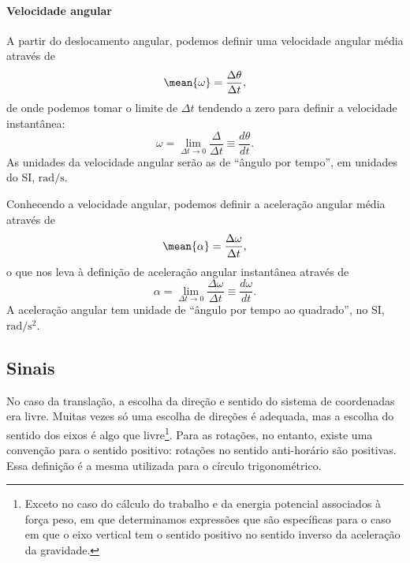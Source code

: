 \paragraph{Velocidade angular}

A partir do deslocamento angular, podemos definir uma velocidade angular média através de
\begin{equation}
	\mean{\omega} = \frac{\Delta\theta}{\Delta t},
\end{equation}
%
de onde podemos tomar o limite de $\Delta t$ tendendo a zero para definir a velocidade instantânea:
\begin{equation}
	\omega = \lim_{\Delta t \to 0} \frac{\Delta}{\Delta t} \equiv \frac{d\theta}{dt}.
\end{equation}
%
As unidades da velocidade angular serão as de ``ângulo por tempo'', em unidades do SI, $\textrm{rad}/\textrm{s}$.

Conhecendo a velocidade angular, podemos definir a aceleração angular média através de
\begin{equation}
	\mean{\alpha} = \frac{\Delta \omega}{\Delta t},
\end{equation}
%
o que nos leva à definição de aceleração angular instantânea através de
\begin{equation}
	\alpha = \lim_{\Delta t \to 0} \frac{\Delta\omega}{\Delta t} \equiv \frac{d\omega}{dt}.
\end{equation}
%
A aceleração angular tem unidade de ``ângulo por tempo ao quadrado'', no SI, $\textrm{rad}/\textrm{s}^2$.

\subsection{Sinais}

No caso da translação, a escolha da direção e sentido do sistema de coordenadas era livre. Muitas vezes só uma escolha de direções é adequada, mas a escolha do sentido dos eixos é algo que livre\footnote{Exceto no caso do cálculo do trabalho e da energia potencial associados à força peso, em que determinamos expressões que são específicas para o caso em que o eixo vertical tem o sentido positivo no sentido inverso da aceleração da gravidade.}. Para as rotações, no entanto, existe uma convenção para o sentido positivo: rotações no sentido anti-horário são positivas. Essa definição é a mesma utilizada para o círculo trigonométrico.

